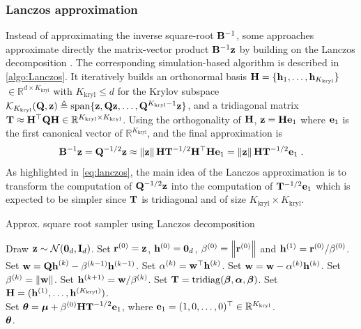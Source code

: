 \documentclass[nohypdvips,onefignum,onetabnum]{siamart171218}
\begin{document}
\subsubsection{Lanczos approximation}
Instead of approximating the inverse square-root $\mathbf{B}^{-1}$, some approaches approximate directly the matrix-vector product $\mathbf{B}^{-1}\mathbf{z}$ by building on the Lanczos decomposition \cite{Ilic2004,Simpson2008,Ilic2009,Aune2013,Simpson2013,Chow2014}.
The corresponding simulation-based algorithm is described in \cref{algo:Lanczos}.
It iteratively builds an orthonormal basis $\mathbf{H} = \{\mathbf{h}_1,\hdots,\mathbf{h}_{K_{\mathrm{kryl}}}\}$ $\in \mathbb{R}^{d \times K_{\mathrm{kryl}}}$ with $K_{\mathrm{kryl}} \leq d$ for the Krylov subspace $\mathcal{K}_{K_{\mathrm{kryl}}}(\mathbf{Q},\mathbf{z}) \triangleq \mathrm{span}\{\mathbf{z},\mathbf{Qz},\hdots,\mathbf{Q}^{K_{\mathrm{kryl}}-1} \mathbf{z}\}$, and a tridiagonal matrix $\mathbf{T} \approx \mathbf{H}^{\top}\mathbf{Q}\mathbf{H} \in \mathbb{R}^{K_{\mathrm{kryl}} \times K_{\mathrm{kryl}}}$.
Using the orthogonality of $\mathbf{H}$, $\mathbf{z} = \mathbf{H}\mathbf{e}_1$ where $\mathbf{e}_1$ is the first canonical vector of $\mathbb{R}^{K_{\mathrm{kryl}}}$, and the final approximation is 
\begin{equation}
    \label{eq:lanczos}
    \B{B}^{-1}\B{z} = \B{Q}^{-1/2}\B{z} \approx \nr{\B{z}}\B{H}\B{T}^{-1/2}\B{H}^{\top}\B{H}\B{e}_1 = \nr{\B{z}}\B{H}\B{T}^{-1/2}\B{e}_1\eqsp.
\end{equation}
As highlighted in \cref{eq:lanczos}, the main idea of the Lanczos approximation is to transform the computation of $\mathbf{Q}^{-1/2}\mathbf{z}$ into the computation of $\mathbf{T}^{-1/2}\mathbf{e}_1$ which is expected to be simpler since $\mathbf{T}$ is tridiagonal and of size $K_{\mathrm{kryl}} \times K_{\mathrm{kryl}}$.

%
\begin{algorithm}
\caption{Approx. square root sampler using Lanczos decomposition}
\label{algo:Lanczos}
\begin{algorithmic}[1]
  \State Draw $\mathbf{z} \sim \mathcal{N}(\mathbf{0}_d,\mathbf{I}_d)$.
  \State Set $\mathbf{r}^{(0)} = \mathbf{z}$, $\mathbf{h}^{(0)} = \mathbf{0}_d$, $\beta^{(0)} = \left\|\mathbf{r}^{(0)}\right\|$ and $\mathbf{h}^{(1)} = \mathbf{r}^{(0)}/\beta^{(0)}$.
  \State Set $\mathbf{w} = \mathbf{Q h}^{(k)} - \beta^{(k-1)}\mathbf{h}^{(k-1)}$.
    \State Set $\alpha^{(k)} = \mathbf{w}^{\top}\mathbf{h}^{(k)}$.
    \State Set $\mathbf{w} = \mathbf{w} - \alpha^{(k)}\mathbf{h}^{(k)}$.\Comment{\textcolor{green}{Gram–Schmidt orthogonalization process.}}
    \State Set $\beta^{(k)} = \left\|\mathbf{w}\right\|$.
    \State Set $\mathbf{h}^{(k+1)} = \mathbf{w}/\beta^{(k)}$.
  \EndFor
  \State Set $\mathbf{T} = \mathrm{tridiag}(\boldsymbol{\beta},\boldsymbol{\alpha},\boldsymbol{\beta})$.
  \State Set $\mathbf{H} = (\mathbf{h}^{(1)},\hdots,\mathbf{h}^{(K_{\mathrm{kryl}})})$.\\
  \State Set $\boldsymbol{\theta} = \boldsymbol{\mu} + \beta^{(0)}\mathbf{HT}^{-1/2}\mathbf{e}_1$, where $\mathbf{e}_1 = (1,0,\hdots,0)^{\top} \in \mathbb{R}^{K_{\mathrm{kryl}}}$.\\
  \Return $\boldsymbol{\theta}$.

\end{algorithmic}
\end{algorithm}
\end{document}

